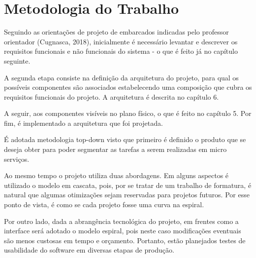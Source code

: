 \chapter{Metodologia do Trabalho}
Seguindo as orientações de projeto de embarcados indicadas pelo professor orientador (Cugnasca, 2018), inicialmente é necessário levantar e descrever os requisitos funcionais e não funcionais do sistema - o que é feito já no capítulo seguinte.

A segunda etapa consiste na definição da arquitetura do projeto, para qual os possíveis componentes são associados estabelecendo uma composição que cubra os requisitos funcionais do projeto. A arquitetura é descrita no capítulo 6.

A seguir, aos componentes visíveis no plano físico, o que é feito no capítulo 5. Por fim, é implementado a arquitetura que foi projetada.

É adotada metodologia top-down visto que primeiro é definido o produto que se deseja obter para poder segmentar as tarefas a serem realizadas em micro serviços.

Ao mesmo tempo o projeto utiliza duas abordagens. Em alguns aspectos é utilizado o modelo em cascata, pois, por se tratar de um trabalho de formatura, é natural que algumas otimizações sejam reservadas para projetos futuros. Por esse ponto de vista, é como se cada projeto fosse uma curva na espiral.

Por outro lado, dada a abrangência tecnológica do projeto, em frentes como a interface será adotado o modelo espiral, pois neste caso modificações eventuais são menos custosas em tempo e orçamento. Portanto, estão planejados testes de usabilidade do software em diversas etapas de produção.
